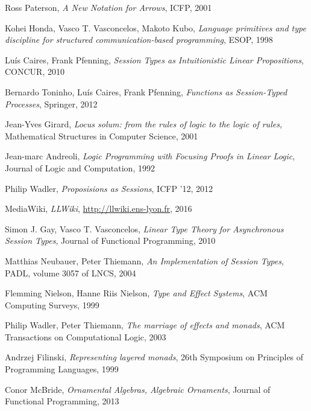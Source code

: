 \documentclass{article}
\begin{document}
\begin{thebibliography}{99}
    Ross Paterson,
    \emph{A New Notation for Arrows},
    ICFP,
    2001

    Kohei Honda, Vasco T. Vasconcelos, Makoto Kubo,
    \emph{Language primitives and type discipline for structured
      communication-based programming},
    ESOP,
    1998

    Lu\'is Caires, Frank Pfenning,
    \emph{Session Types as Intuitionistic Linear Propositions},
    CONCUR,
    2010

    Bernardo Toninho, Lu\'is Caires, Frank Pfenning,
    \emph{Functions as Session-Typed Processes},
    Springer,
    2012

    Jean-Yves Girard,
    \emph{Locus solum: from the rules of logic to the logic of rules},
    Mathematical Structures in Computer Science,
    2001

    Jean-marc Andreoli,
    \emph{Logic Programming with Focusing Proofs in Linear Logic},
    Journal of Logic and Computation,
    1992

    Philip Wadler,
    \emph{Proposisions as Sessions},
    ICFP '12,
    2012

    MediaWiki,
    \emph{LLWiki},
    \url{http://llwiki.ens-lyon.fr},
    2016

    Simon J. Gay, Vasco T. Vasconcelos,
    \emph{Linear Type Theory for Asynchronous Session Types},
    Journal of Functional Programming,
    2010

    Matthias Neubauer, Peter Thiemann,
    \emph{An Implementation of Session Types},
    PADL, volume 3057 of LNCS,
    2004

    Flemming Nielson, Hanne Riis Nielson,
    \emph{Type and Effect Systems},
    ACM Computing Surveys,
    1999

    Philip Wadler, Peter Thiemann,
    \emph{The marriage of effects and monads},
    ACM Transactions on Computational Logic,
    2003

    Andrzej Filinski,
    \emph{Representing layered monads},
    26th Symposium on Principles of Programming Languages,
    1999

    Conor McBride,
    \emph{Ornamental Algebras, Algebraic Ornaments},
    Journal of Functional Programming,
    2013


\end{thebibliography}
\end{document}
